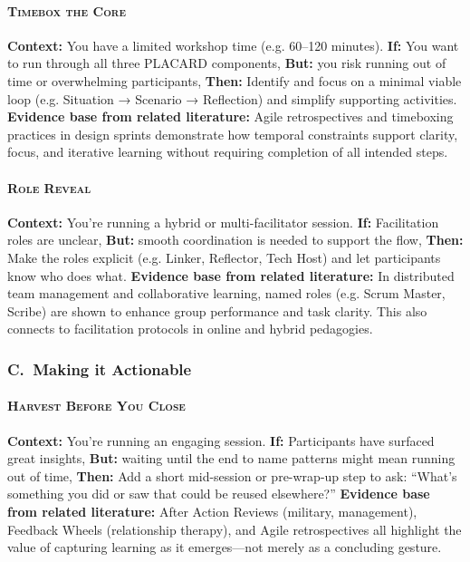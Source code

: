 \documentclass[acmlarge,timestamp]{acmart}
\begin{document}
{\paragraph*{{\scshape Timebox the Core}}

\noindent \textbf{Context:} You have a limited workshop time (e.g. 60–120 minutes).
\textbf{If:} You want to run through all three PLACARD components,  \textbf{But:} you risk running out of time or overwhelming participants,
\textbf{Then:} Identify and focus on a minimal viable loop (e.g. Situation → Scenario → Reflection) and simplify supporting activities.
\textbf{Evidence base from related literature:} Agile retrospectives and timeboxing practices in design sprints demonstrate how temporal constraints support clarity, focus, and iterative learning without requiring completion of all intended steps.

\paragraph*{{\scshape Role Reveal}}

\noindent \textbf{Context:} You’re running a hybrid or multi-facilitator session.
\textbf{If:} Facilitation roles are unclear,  \textbf{But:} smooth coordination is needed to support the flow,
\textbf{Then:} Make the roles explicit (e.g. Linker, Reflector, Tech Host) and let participants know who does what.
\textbf{Evidence base from related literature:} In distributed team management and collaborative learning, named roles (e.g. Scrum Master, Scribe) are shown to enhance group performance and task clarity. This also connects to facilitation protocols in online and hybrid pedagogies.

\subsubsection*{C.~Making it Actionable}

\paragraph*{{\scshape Harvest Before You Close}}

\noindent \textbf{Context:} You’re running an engaging session.
\textbf{If:} Participants have surfaced great insights,  \textbf{But:} waiting until the end to name patterns might mean running out of time,
\textbf{Then:} Add a short mid-session or pre-wrap-up step to ask: “What’s something you did or saw that could be reused elsewhere?”
\textbf{Evidence base from related literature:} After Action Reviews (military, management), Feedback Wheels (relationship therapy), and Agile retrospectives all highlight the value of capturing learning as it emerges—not merely as a concluding gesture.

}
\end{document}
